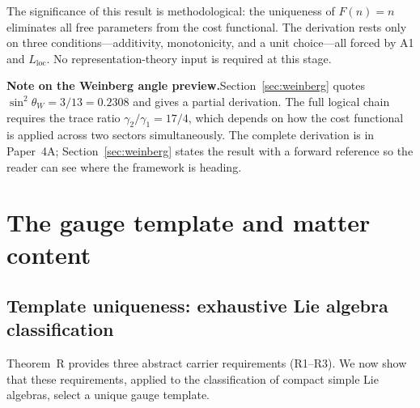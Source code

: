 \documentclass[11pt]{article}
\begin{document}
The significance of this result is methodological: the uniqueness of $F(n) = n$ eliminates all free parameters from the cost functional.  The derivation rests only on three conditions---additivity, monotonicity, and a unit choice---all forced by A1 and $L_{\mathrm{loc}}$.  No representation-theory input is required at this stage.

\smallskip
\noindent\textbf{Note on the Weinberg angle preview.}\quad Section~\ref{sec:weinberg} quotes $\sin^2\theta_W = 3/13 = 0.2308$ and gives a partial derivation.  The full logical chain requires the trace ratio $\gamma_2/\gamma_1 = 17/4$, which depends on how the cost functional is applied across two sectors simultaneously.  The complete derivation is in Paper~4A; Section~\ref{sec:weinberg} states the result with a forward reference so the reader can see where the framework is heading.


\section{The gauge template and matter content}
\label{sec:gauge_template}

\subsection{Template uniqueness: exhaustive Lie algebra classification}

Theorem~R provides three abstract carrier requirements (R1--R3).  We now show that these requirements, applied to the classification of compact simple Lie algebras, select a unique gauge template.
\end{document}
